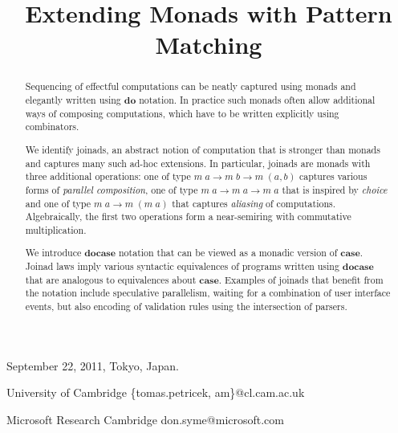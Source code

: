 \documentclass{sigplanconf}
\newcommand{\Varid}[1]{\mathit{#1}}
\begin{document}

\newcommand{\ident}[1]{{\normalfont\sffamily #1}}
\newcommand{\code}[1]{{\normalfont\ttfamily #1}}
\newcommand{\mzip}[0]{\otimes}
\newcommand{\morelse}[0]{\oplus}
\newcommand{\mzero}[0]{\Varid{mzero}}
\newcommand{\munit}[0]{\Varid{unit}}
\newcommand{\map}[0]{\Varid{map}}
\newcommand{\malias}[0]{\Varid{malias}}
\newcommand{\mcojoin}[0]{\Varid{cojoin}}
\newcommand{\mplus}[0]{\oplus}
\newcommand{\fsharp}[0]{F$^\#$}
\newcommand{\todo}[1]{\textcolor{red}{[TODO] #1}}

 {September 22, 2011, Tokyo, Japan.}


\title{Extending Monads with Pattern Matching}

           {University of Cambridge}
           {\{tomas.petricek, am\}@cl.cam.ac.uk}

           {Microsoft Research Cambridge}
           {don.syme@microsoft.com}

\maketitle

\begin{abstract}
Sequencing of effectful computations can be neatly captured using monads and elegantly written using 
\ensuremath{\mathbf{do}} notation. In practice such monads often allow additional ways of composing computations, 
which have to be written explicitly using combinators.

We identify joinads, an abstract notion of computation that is stronger than monads and captures
many such ad-hoc extensions. In particular, joinads are monads with three additional operations: 
one of type \ensuremath{\Varid{m}\;\Varid{a}\to \Varid{m}\;\Varid{b}\to \Varid{m}\;(\Varid{a},\Varid{b})} captures various forms of \textit{parallel composition}, 
one of type \ensuremath{\Varid{m}\;\Varid{a}\to \Varid{m}\;\Varid{a}\to \Varid{m}\;\Varid{a}} that is inspired by \textit{choice} and one of type \ensuremath{\Varid{m}\;\Varid{a}\to \Varid{m}\;(\Varid{m}\;\Varid{a})} 
that captures \textit{aliasing} of computations. Algebraically, the first two operations form a 
near-semiring with commutative multiplication.

We introduce \ensuremath{\mathbf{docase}} notation that can be viewed as a monadic version of \ensuremath{\mathbf{case}}. Joinad laws
imply various syntactic equivalences of programs written using \ensuremath{\mathbf{docase}} 
that are analogous to equivalences about \ensuremath{\mathbf{case}}. Examples of joinads that benefit from the notation
include speculative parallelism, waiting for a combination of user interface events, but also 
encoding of validation rules using the intersection of parsers. 
\end{abstract}
\end{document}
